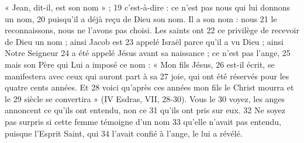 « Jean, dit-il, est son nom » ;	 
19	 	c'est-à-dire : ce n'est pas nous qui lui donnons un nom,	 
20	 	puisqu'il a déjà reçu de Dieu son nom. Il a son nom : nous	 
21	 	le reconnaissons, nous ne l'avons pas choisi. Les saints ont	 
22	 	ce privilège de recevoir de Dieu un nom ; ainsi Jacob est	 
23	 	appelé Israël parce qu'il a vu Dieu ; ainsi Notre Seigneur	 
24	 	a été appelé Jésus avant sa naissance ; ce n'est pas l'ange,	 
25	 	mais son Père qui Lui a imposé ce nom : « Mon fils Jésus,	 
26	 	est-il écrit, se manifestera avec ceux qui auront part à sa	 
27	 	joie, qui ont été réservés pour les quatre cents années. Et	 
28	 	voici qu'après ces années mon fils le Christ mourra et le	 
29	 	siècle se convertira » (IV Esdras, VII, 28-30). Vous le	 
30	 	voyez, les anges annoncent ce qu'ils ont entendu, non ce	 
31	 	qu'ils ont pris sur eux.	 
32	 	Ne soyez pas surpris si cette femme témoigne d'un nom	 
33	 	qu'elle n'avait pas entendu, puisque l'Esprit Saint, qui	 
34	 	l'avait confié à l'ange, le lui a révélé.